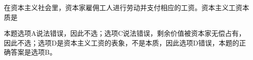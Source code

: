 \question 在资本主义社会里，资本家雇佣工人进行劳动并支付相应的工资。资本主义工资本质是
\par{}
\begin{solution}本题选项A说法错误，因此不选；选项C说法错误，剩余价值被资本家无偿占有，因此不选；选项D是资本主义工资的表象，不是本质，因此选项D错误，本题的正确答案是选项B。
\end{solution}
